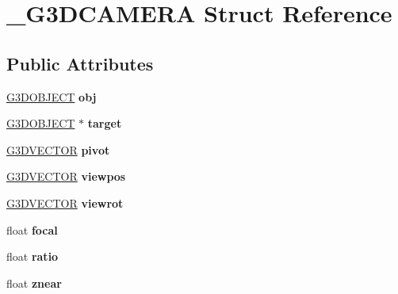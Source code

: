 \hypertarget{struct__G3DCAMERA}{}\section{\+\_\+\+G3\+D\+C\+A\+M\+E\+RA Struct Reference}
\label{struct__G3DCAMERA}
\subsection*{Public Attributes}
\begin{DoxyCompactItemize}
\item 
\mbox{\label{struct__G3DCAMERA_aafbd6b70e3854d2521545b8efaef0d9d}} 
\hyperlink{struct__G3DOBJECT}{G3\+D\+O\+B\+J\+E\+CT} {\bfseries obj}
\item 
\mbox{\label{struct__G3DCAMERA_a934f59b0de4a4a69db4ab7d5bba7c649}} 
\hyperlink{struct__G3DOBJECT}{G3\+D\+O\+B\+J\+E\+CT} $\ast$ {\bfseries target}
\item 
\mbox{\label{struct__G3DCAMERA_a0e7944e18aea56881f81751a7c41aba0}} 
\hyperlink{structG3DVECTOR}{G3\+D\+V\+E\+C\+T\+OR} {\bfseries pivot}
\item 
\mbox{\label{struct__G3DCAMERA_aeccab6f2b31087755cf274501cecf85f}} 
\hyperlink{structG3DVECTOR}{G3\+D\+V\+E\+C\+T\+OR} {\bfseries viewpos}
\item 
\mbox{\label{struct__G3DCAMERA_adcfbbc514b11f52ee0ab27e88f91ff5d}} 
\hyperlink{structG3DVECTOR}{G3\+D\+V\+E\+C\+T\+OR} {\bfseries viewrot}
\item 
\mbox{\label{struct__G3DCAMERA_adba6389e8302ce744cf539b8ee94393c}} 
float {\bfseries focal}
\item 
\mbox{\label{struct__G3DCAMERA_ae30b3fb99716f0f4a9e2cda650a5a108}} 
float {\bfseries ratio}
\item 
\mbox{\label{struct__G3DCAMERA_a04b75b168d96a0f8ba56c9b5a53ffc75}} 
float {\bfseries znear}
\item 
\mbox{\label{struct__G3DCAMERA_aa81fe196c2e3033b340b71fa40b633a1}} 

\end{DoxyCompactItemize}
